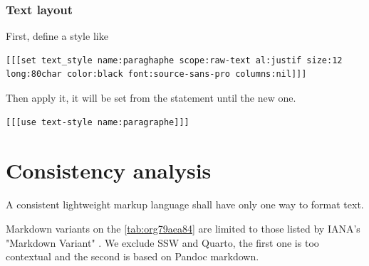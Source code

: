 \documentclass[a4paper,12pt]{article}
\begin{document}
\subsubsection{Text layout}
\label{sec:orgfdc0e8b}
First, define a style like
\begin{verbatim}
[[[set text_style name:paraghaphe scope:raw-text al:justif size:12 long:80char color:black font:source-sans-pro columns:nil]]]
\end{verbatim}

Then apply it, it will be set from the statement until the new one.
\begin{verbatim}
[[[use text-style name:paragraphe]]]
\end{verbatim}
\section{Consistency analysis}
\label{sec:org6fb774f}
A consistent lightweight markup language shall have only one way to format text.

Markdown variants on the \ref{tab:org79aea84} are limited to those listed by IANA's "Markdown Variant" \autocite{MarkdownVariants2023}. We exclude SSW and Quarto, the first one is too contextual and the second is based on Pandoc markdown.
\end{document}
